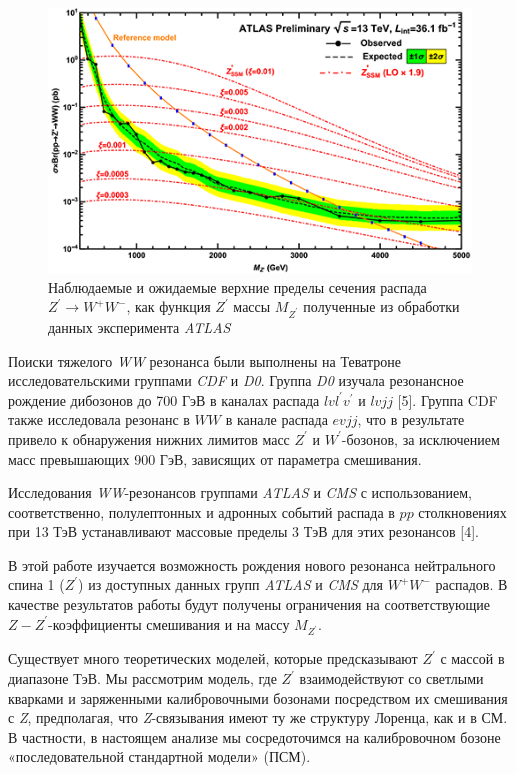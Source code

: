 \begin{figure}[!h]
	\centering
	\includegraphics[width=\textwidth]{figures/graph-1-verify.png}
	\caption{Наблюдаемые и ожидаемые верхние пределы сечения распада ${Z}^{\prime} \rightarrow {W}^{+}{W}^{-} $, как функция ${Z}^{\prime}$ массы ${M}_{{Z}^{\prime}}$ полученные из обработки данных эксперимента \textit{ATLAS}}
	\label{fig:graph-1-verify}
\end{figure}

Поиски тяжелого \textit{WW} резонанса были выполнены на Теватроне исследовательскими группами \textit{CDF} и \textit{D0}. Группа \textit{D0} изучала резонансное рождение дибозонов до 700 ГэВ в каналах распада $lvl^\prime v^\prime$ и $lvjj$ [5]. Группа CDF также исследовала резонанс в $WW$ в канале распада $evjj$, что в результате привело к обнаружения нижних лимитов масс $Z^\prime$
и $W^\prime$-бозонов, за исключением масс превышающих 900 ГэВ, зависящих от параметра смешивания.

Исследования \textit{WW}-резонансов группами \textit{ATLAS} и \textit{CMS} с использованием, соответственно, полулептонных и адронных событий распада в $pp$ столкновениях при 13 ТэВ устанавливают массовые пределы 3 ТэВ для этих резонансов [4]. 

В этой работе изучается возможность рождения нового резонанса нейтрального спина 1 ($Z^\prime$) из доступных данных групп \textit{ATLAS} и \textit{CMS} для $W^+W^-$ распадов. В качестве результатов работы будут получены ограничения на соответствующие $Z-Z^\prime$-коэффициенты смешивания и на массу $M_{Z^\prime}$.

Существует много теоретических моделей, которые предсказывают $Z^\prime$ с массой в диапазоне ТэВ. Мы рассмотрим модель, где $Z^\prime$ взаимодействуют со светлыми кварками и заряженными калибровочными бозонами посредством их смешивания с \textit{Z}, предполагая, что \textit{Z}-связывания имеют ту же структуру Лоренца, как и в СМ. В частности, в настоящем анализе мы сосредоточимся на калибровочном бозоне «последовательной стандартной модели» (ПСМ).

